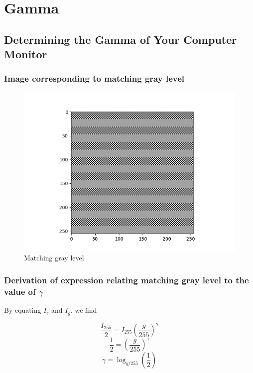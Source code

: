 \documentclass{article}
\begin{document}
\section{Gamma}
\subsection{Determining the Gamma of Your Computer Monitor}
\subsubsection{Image corresponding to matching gray level}
\begin{figure}[H]
    \centering
    \includegraphics[width=1\textwidth]{../matching-gray-levels-140.png}
    \caption{Matching gray level}
\end{figure}
\subsubsection{Derivation of expression relating matching gray level to the value of $\gamma$}
By equating $I_c$ and $I_g$, we find

\begin{equation*}
    \frac{I_{255}}{2} = I_{255}(\frac{g}{255})^\gamma
\end{equation*}
\begin{equation*}
    \frac{1}{2} = (\frac{g}{255})^\gamma
\end{equation*}
\begin{equation*}
    \gamma = \log_{g/255}(\frac{1}{2})
\end{equation*}
\end{document}

